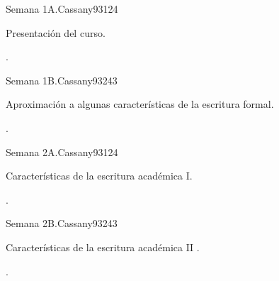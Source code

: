 \begin{syllabus}
\begin{competences}
    \item {}
    \item {}
    \item {}
\end{competences}

\begin{unit}{}{Semana 1A.}{Cassany93}{12}{4}
   \begin{topics}
      \item Presentación del curso.
   \end{topics}
   \begin{learningoutcomes}
      \item .
   \end{learningoutcomes}
\end{unit}

\begin{unit}{}{Semana 1B.}{Cassany93}{24}{3}
   \begin{topics}
      \item Aproximación a algunas características de la escritura formal.
   \end{topics}

   \begin{learningoutcomes}
      \item .
      \end{learningoutcomes}
\end{unit}

\begin{unit}{}{Semana 2A.}{Cassany93}{12}{4}
   \begin{topics}
      \item Características de la escritura académica I.
   \end{topics}
   \begin{learningoutcomes}
      \item .
   \end{learningoutcomes}
\end{unit}

\begin{unit}{}{Semana 2B.}{Cassany93}{24}{3}
   \begin{topics}
      \item Características de la escritura académica II .
   \end{topics}

   \begin{learningoutcomes}
      \item . 
   \end{learningoutcomes}
\end{unit}


\end{syllabus}
